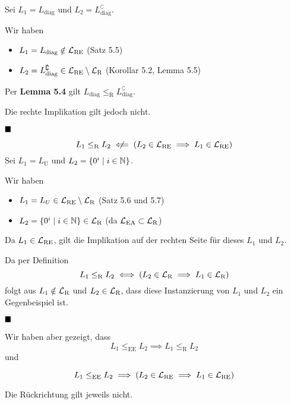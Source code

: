             Sei $L_1 = L_{\text{diag}}$ und $L_2 = L_{\text{diag}}^\complement$.
        
            Wir haben 
            \begin{itemize}[label=$\blacktriangleright$]
                \item $L_1 = L_{\text{diag}} \notin \mathcal{L}_\text{RE}$ \hfill (Satz 5.5)
                \item $L_2 = L_{\text{diag}}^\complement \in \mathcal{L}_\text{RE}\setminus\mathcal{L}_\text{R}$ \hfill(Korollar 5.2, Lemma 5.5)
            \end{itemize}
            
            Per \textbf{Lemma 5.4} gilt $L_{\text{diag}} \leq_{\text{R}} L_{\text{diag}}^\complement$.
        
            Die rechte Implikation gilt jedoch nicht.
            
            $\hfill\blacksquare$
        
            $$L_1 \leq_{\text{R}} L_2 \centernot{\impliedby} (L_2 \in \Lre \implies L_1 \in \Lre)$$
            Sei $L_1 = L_{\text{U}}$ und $L_2 = \{0^i \mid i \in \mathbb{N}\}$.
        
            Wir haben 
            \begin{itemize}[label=$\blacktriangleright$]
                \item $L_1 = L_{U} \in \mathcal{L}_\text{RE} \setminus \mathcal{L}_\text{R}$ \hfill (Satz 5.6 und 5.7)
                \item $L_2 = \{0^i \mid i \in \mathbb{N}\} \in \mathcal{L}_\text{R}$ \hfill(da $\mathcal{L}_{\text{EA}} \subset \mathcal{L}_\text{R}$)
            \end{itemize}
            
            Da $L_1 \in \mathcal{L}_\text{RE}$, gilt die Implikation auf der rechten Seite für dieses $L_1$ und $L_2$.
        
            
            Da per Definition
            $$L_1 \leq_{\text{R}} L_2 \iff (L_2 \in \mathcal{L}_\text{R} \implies L_1 \in \mathcal{L}_\text{R})$$
            folgt aus $L_1 \notin \mathcal{L}_\text{R}$ und $L_2 \in \mathcal{L}_\text{R}$, dass diese Instanzierung von $L_1$ und $L_2$ ein Gegenbeispiel ist.
            
            $\hfill\blacksquare$
        

            Wir haben aber gezeigt, dass 
            $$L_1 \leq_{\text{EE}} L_2 \implies L_1 \leq_{\text{R}} L_2$$
            und 
            
            $$L_1 \leq_{\text{EE}} L_2 \implies (L_2 \in \mathcal{L}_\text{RE} \implies L_1 \in \mathcal{L}_\text{RE})$$
        
            Die Rückrichtung gilt jeweils nicht.